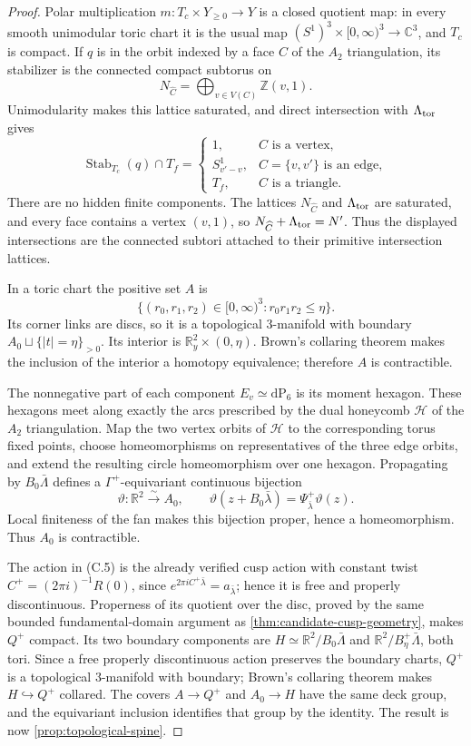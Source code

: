 \begin{proof}
Polar multiplication $m:T_c\times Y_{\geq0}\to Y$ is a closed quotient map:
in every smooth unimodular toric chart it is the usual map
$(S^1)^3\times[0,\infty)^3\to\mathbb C^3$, and $T_c$ is compact.  If $q$ is
in the orbit indexed by a face $C$ of the $A_2$ triangulation, its stabilizer
is the connected compact subtorus on
\[
 N_{\widehat C}=\bigoplus_{v\in V(C)}\mathbb Z(v,1).
\]
Unimodularity makes this lattice saturated, and direct intersection with
$\Lambda_{\rm tor}$ gives
\[
 \operatorname{Stab}_{T_c}(q)\cap T_f=
 \begin{cases}
  1,&C\text{ is a vertex},\\
  S^1_{v'-v},&C=\{v,v'\}\text{ is an edge},\\
  T_f,&C\text{ is a triangle}.
 \end{cases}
\tag{C.7}
\]
There are no hidden finite components.  The lattices
$N_{\widehat C}$ and $\Lambda_{\rm tor}$ are saturated, and every face contains
a vertex $(v,1)$, so
$N_{\widehat C}+\Lambda_{\rm tor}=N'$.  Thus the displayed intersections are
the connected subtori attached to their primitive intersection lattices.

In a toric chart the positive set $A$ is
\[
 \{(r_0,r_1,r_2)\in[0,\infty)^3:r_0r_1r_2\leq\eta\}.
\]
Its corner links are discs, so it is a topological $3$-manifold with boundary
$A_0\sqcup\{|t|=\eta\}_{>0}$.  Its interior is
$\mathbb R_y^2\times(0,\eta)$.  Brown's collaring theorem
\cite{Brown1962} makes the inclusion of the interior a homotopy equivalence;
therefore $A$ is contractible.

The nonnegative part of each component $E_v\simeq\mathrm{dP}_6$ is its moment
hexagon.  These hexagons meet along exactly the arcs prescribed by the dual
honeycomb $\mathcal H$ of the $A_2$ triangulation.  Map the two vertex orbits
of $\mathcal H$ to the corresponding torus fixed points, choose homeomorphisms
on representatives of the three edge orbits, and extend the resulting circle
homeomorphism over one hexagon.  Propagating by $B_0\bar\Lambda$ defines a
$\Gamma^+$-equivariant continuous bijection
\[
 \vartheta:\mathbb R^2\xrightarrow{\sim}A_0,\qquad
 \vartheta(z+B_0\bar\lambda)=
 \Psi^+_{\bar\lambda}\vartheta(z).
\tag{C.8}
\]
Local finiteness of the fan makes this bijection proper, hence a homeomorphism.
Thus $A_0$ is contractible.

The action in (C.5) is the already verified cusp action with constant twist
$C^+=(2\pi i)^{-1}R(0)$, since
$e^{2\pi iC^+\bar\lambda}=a_{\bar\lambda}$; hence it is free and properly
discontinuous.  Properness of its quotient over
the disc, proved by the same bounded fundamental-domain argument as
\cref{thm:candidate-cusp-geometry}, makes $Q^+$ compact.  Its two boundary
components are $H\simeq\mathbb R^2/B_0\bar\Lambda$ and
$\mathbb R^2/B_\eta^+\bar\Lambda$, both tori.  Since a free properly
discontinuous action preserves the boundary charts, $Q^+$ is a topological
$3$-manifold with boundary; Brown's collaring theorem makes
$H\hookrightarrow Q^+$ collared.  The covers $A\to Q^+$ and
$A_0\to H$ have the same deck group, and the equivariant inclusion identifies
that group by the identity.  The result is now
\cref{prop:topological-spine}.
\end{proof}

